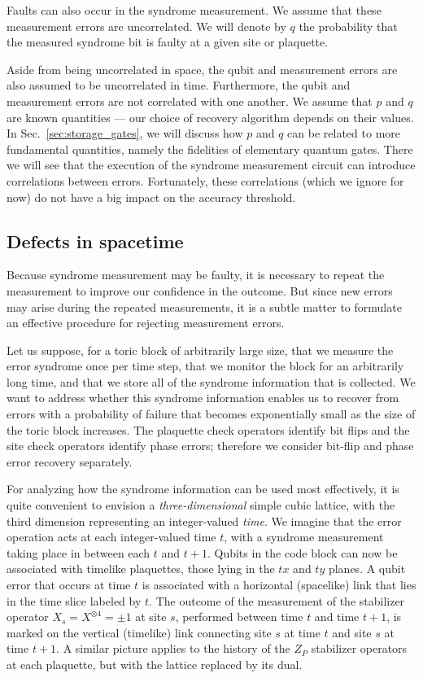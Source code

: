 Faults can also occur in the syndrome measurement. We assume that these measurement errors are  uncorrelated. We will denote by $q$ the probability that the measured syndrome bit is faulty at a given site or plaquette.  

Aside from being uncorrelated in space, the qubit and measurement errors are
also assumed to be uncorrelated in time.  Furthermore, the qubit and
measurement errors are not correlated with one another.  We assume that $p$ and
$q$ are known quantities --- our choice of recovery algorithm depends on their
values. In Sec.~\ref{sec:storage_gates}, we will discuss how $p$ and $q$ can be related to more fundamental quantities, namely the fidelities of elementary quantum gates.  There we will see that the execution of the syndrome measurement circuit can introduce correlations between errors. Fortunately, these correlations (which we ignore for now) do not have a big impact on the accuracy threshold.

\subsection{Defects in spacetime}

Because syndrome measurement may be faulty, it is necessary to repeat the
measurement to improve our confidence in the outcome.  But since new errors may
arise during the repeated measurements, it is a subtle matter to formulate an
effective procedure for rejecting measurement errors.  

Let us suppose, for a toric block of arbitrarily large size, that we measure the error syndrome once per time step, that we monitor the block for an arbitrarily long time, and that we store all of the syndrome information that is collected. We want to address whether this syndrome information enables us to recover from errors with a probability of failure that becomes  exponentially small as the size of the toric block increases.  The plaquette check operators identify bit flips and the site check operators identify phase errors; therefore we consider bit-flip and phase error recovery separately. 

For analyzing how the syndrome information can be used most effectively, it is quite convenient to envision a {\em three-dimensional} simple cubic lattice, with the third dimension representing an integer-valued {\em time}.  We imagine that the error operation acts at each integer-valued time $t$, with a syndrome measurement taking place in between each $t$ and $t+1$. Qubits in the code block can now be associated with timelike
plaquettes, those lying in the $tx$ and $ty$ planes.  A qubit error that occurs
at time $t$ is associated with a horizontal (spacelike) link that lies in the
time slice labeled by $t$.  The outcome of the measurement of the stabilizer operator $X_s=X^{\otimes 4}=\pm1$ at site $s$, performed between time $t$ and time $t+1$, is marked on the vertical (timelike) link connecting site $s$ at time $t$ and site $s$ at time $t+1$. A similar picture applies to the history of the $Z_P$ stabilizer operators at each plaquette, but with the lattice replaced by its dual.

